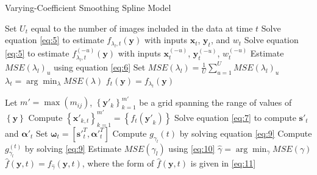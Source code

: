 \documentclass[11pt,reqno]{article}
\theoremstyle{definition}
\begin{document}

\LinesNumbered

\begin{algorithm}
\caption{Varying-Coefficient Smoothing Spline Model}\label{alg:varying_spline}

 {
  Set $U_t$ equal to the number of images included in the data at time $t$\;
   {
    Solve equation \ref{eq:5} to estimate $f_{\lambda_l, t}(\mathbf{y})$ with inputs $\mathbf{x}_t$, $\mathbf{y}_t$, and $w_t$\;
     {
      Solve equation \ref{eq:5} to estimate $f^{(-u)}_{\lambda_l, t}(\mathbf{y})$ with inputs $\mathbf{x}^{(-u)}_t$, $\mathbf{y}^{(-u)}_t$, $w^{(-u)}_t$\;
      Estimate $MSE(\lambda_{l})_u$ using equation \ref{eq:6}\;
    }
    Set $MSE(\lambda_l) = \frac{1}{U}\sum_{u=1}^{U}MSE(\lambda_l)_u$\;
  }
  $\lambda_t = \arg \min_{\lambda} MSE(\lambda)$\;
  $f_t(\mathbf{y}) = f_{\lambda_t}(\mathbf{y})$\;
}

  Let $m' = \max(m_{ij})$, $\left\{\mathbf{y}'_{k}\right\}_{k=1}^{m'}$ be a grid spanning the range of values of $\left\{\mathbf{y}\right\}$\;
   {
    Compute $\left\{\mathbf{x'}_{k, t}\right\}_{k=1}^{m'} = \left\{f_t(\mathbf{y'}_k)\right\}$\;
    Solve equation \ref{eq:7} to compute $\mathbf{s'}_t$ and $\mathbf{\alpha'}_t$\;
    Set $\mathbf{\omega}_t = \left[\mathbf{s'}_t^{T}, \mathbf{\alpha'}_t^{T}\right]$\;
  }
   {
    Compute $g_{\gamma_l}(t)$ by solving equation \ref{eq:9}\;
     {
      Compute $g_{\gamma_l}^{(t)}$ by solving \ref{eq:9}\;
    }
    Estimate $MSE(\gamma_l)$ using \ref{eq:10}\;
  }
  $\hat{\gamma} = \arg \min_{\gamma} MSE(\gamma)$\;
  $\hat{f}(\mathbf{y}, t) = f_{\hat{\gamma}}(\mathbf{y}, t)$, where the form of $\hat{f}(\mathbf{y}, t)$ is given in \ref{eq:11}
\end{algorithm}
\end{document}
